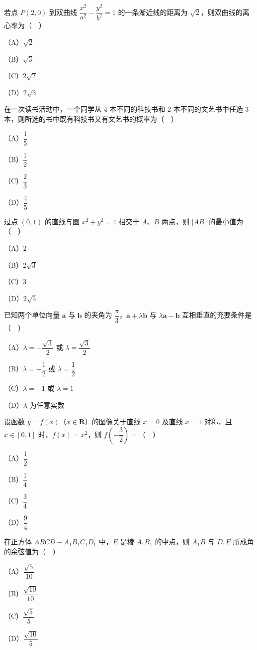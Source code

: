 \begin{question}
若点 $P(2,0)$ 到双曲线 $\dfrac{x^2}{a^2}-\dfrac{y^2}{b^2}=1$ 的一条渐近线的距离为 $\sqrt2$，则双曲线的离心率为（　）

（A）$\sqrt2$

（B）$\sqrt3$

（C）$2\sqrt2$

（D）$2\sqrt3$

\end{question}
\begin{question}
在一次读书活动中，一个同学从 $4$ 本不同的科技书和 $2$ 本不同的文艺书中任选 $3$ 本，则所选的书中既有科技书又有文艺书的概率为（　）

（A）$\dfrac15$

（B）$\dfrac12$

（C）$\dfrac23$

（D）$\dfrac45$

\end{question}
\begin{question}
过点 $(0,1)$ 的直线与圆 $x^2+y^2=4$ 相交于 $A$、$B$ 两点，则 $|AB|$ 的最小值为（　）

（A）$2$

（B）$2\sqrt3$

（C）$3$

（D）$2\sqrt5$

\end{question}
\begin{question}
已知两个单位向量 $\boldsymbol a$ 与 $\boldsymbol b$ 的夹角为 $\dfrac{\pi}3$，$\boldsymbol a+\lambda\boldsymbol b$ 与 $\lambda\boldsymbol a-\boldsymbol b$ 互相垂直的充要条件是（　）

（A）$\lambda=-\dfrac{\sqrt3}2$ 或 $\lambda=\dfrac{\sqrt3}2$

（B）$\lambda=-\dfrac12$ 或 $\lambda=\dfrac12$

（C）$\lambda=-1$ 或 $\lambda=1$

（D）$\lambda$ 为任意实数

\end{question}
\begin{question}
设函数 $y=f(x)$（$x\in\mathbf R$）的图像关于直线 $x=0$ 及直线 $x=1$ 对称，且 $x\in[0,1]$ 时，$f(x)=x^2$，则 $f\left(-\dfrac32\right)=$（　）

（A）$\dfrac12$

（B）$\dfrac14$

（C）$\dfrac34$

（D）$\dfrac94$

\end{question}
\begin{question}
在正方体 $ABCD-A_1B_1C_1D_1$ 中，$E$ 是棱 $A_1B_1$ 的中点，则 $A_1B$ 与 $D_1E$ 所成角的余弦值为（　）

（A）$\dfrac{\sqrt5}{10}$

（B）$\dfrac{\sqrt{10}}{10}$

（C）$\dfrac{\sqrt5}5$

（D）$\dfrac{\sqrt{10}}5$

\end{question}

